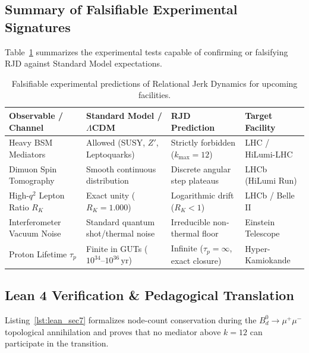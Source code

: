 \documentclass[11pt,a4paper]{article}
\theoremstyle{plain}
\theoremstyle{definition}
\theoremstyle{remark}
\begin{document}
\subsection{Summary of Falsifiable Experimental Signatures}
Table~\ref{tab:predictions} summarizes the experimental tests capable of confirming or falsifying RJD against Standard Model expectations.

\begin{table}[htbp]
\centering
\caption{Falsifiable experimental predictions of Relational Jerk Dynamics for upcoming facilities.}
\label{tab:predictions}
\small
\begin{tabularx}{\textwidth}{@{}lXXl@{}}
\toprule
\textbf{Observable / Channel} & \textbf{Standard Model / $\Lambda$CDM} & \textbf{RJD Prediction} & \textbf{Target Facility} \\
\midrule
Heavy BSM Mediators & Allowed (SUSY, $Z'$, Leptoquarks) & Strictly forbidden ($k_{\max}=12$) & LHC / HiLumi-LHC \\
Dimuon Spin Tomography & Smooth continuous distribution & Discrete angular step plateaus & LHCb (HiLumi Run) \\
High-$q^2$ Lepton Ratio $R_K$ & Exact unity ($R_K = 1.000$) & Logarithmic drift ($R_K < 1$) & LHCb / Belle II \\
Interferometer Vacuum Noise & Standard quantum shot/thermal noise & Irreducible non-thermal floor & Einstein Telescope \\
Proton Lifetime $\tau_p$ & Finite in GUTs ($10^{34}\text{--}10^{36}\,\text{yr}$) & Infinite ($\tau_p = \infty$, exact closure) & Hyper-Kamiokande \\
\bottomrule
\end{tabularx}
\end{table}

\clearpage

\subsection{Lean 4 Verification \& Pedagogical Translation}
Listing~\ref{lst:lean_sec7} formalizes node-count conservation during the $B_d^0 \to \mu^+ \mu^-$ topological annihilation and proves that no mediator above $k=12$ can participate in the transition.
\end{document}
